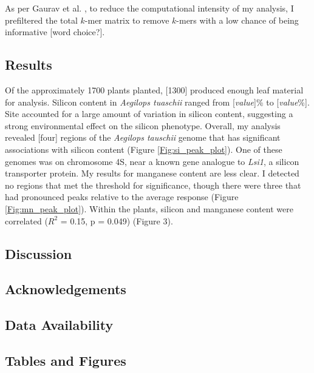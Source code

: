 \documentclass[12pt, letterpaper, ]{article}
\begin{document}
As per Gaurav et al. , to reduce the computational intensity of my analysis, I prefiltered the total $k$-mer matrix to remove $k$-mers with a low chance of being informative [word choice?]. 

\subsection{Results}

Of the approximately 1700 plants planted, [1300] produced enough leaf material for analysis. Silicon content in \textit{Aegilops tuaschii} ranged from [\textit{value}]\% to [\textit{value}\%]. Site accounted for a large amount of variation in silicon content, suggesting a strong environmental effect on the silicon phenotype. Overall, my analysis revealed [four] regions of the \textit{Aegilops tauschii} genome that has significant associations with silicon content (Figure \ref{Fig:si_peak_plot}). One of these genomes was on chromosome 4S, near a known gene analogue to \textit{Lsi1}, a silicon transporter protein. My results for manganese content are less clear. I detected no regions that met the threshold for significance, though there were three that had pronounced peaks relative to the average response (Figure \ref{Fig:mn_peak_plot}). Within the plants, silicon and manganese content were correlated ($R^2$ = 0.15, p = 0.049) (Figure 3). 

\subsection{Discussion}

\subsection{Acknowledgements}

\subsection{Data Availability}

\subsection{Tables and Figures}
\end{document}
